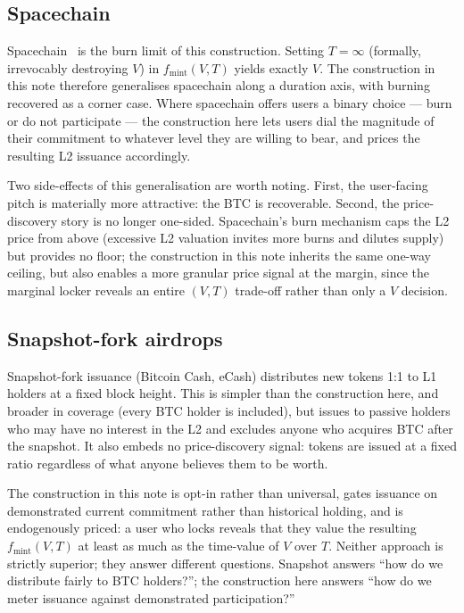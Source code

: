\documentclass[11pt,a4paper]{article}
\newcommand{\fmint}{f_{\mathrm{mint}}}
\begin{document}
\subsection{Spacechain}

Spacechain~\cite{spacechain} is the burn limit of this construction. Setting $T = \infty$ (formally, irrevocably destroying $V$) in $\fmint(V, T)$ yields exactly $V$. The construction in this note therefore generalises spacechain along a duration axis, with burning recovered as a corner case. Where spacechain offers users a binary choice --- burn or do not participate --- the construction here lets users dial the magnitude of their commitment to whatever level they are willing to bear, and prices the resulting L2 issuance accordingly.

Two side-effects of this generalisation are worth noting. First, the user-facing pitch is materially more attractive: the BTC is recoverable. Second, the price-discovery story is no longer one-sided. Spacechain's burn mechanism caps the L2 price from above (excessive L2 valuation invites more burns and dilutes supply) but provides no floor; the construction in this note inherits the same one-way ceiling, but also enables a more granular price signal at the margin, since the marginal locker reveals an entire $(V, T)$ trade-off rather than only a $V$ decision.

\subsection{Snapshot-fork airdrops}

Snapshot-fork issuance (Bitcoin Cash, eCash) distributes new tokens 1:1 to L1 holders at a fixed block height. This is simpler than the construction here, and broader in coverage (every BTC holder is included), but issues to passive holders who may have no interest in the L2 and excludes anyone who acquires BTC after the snapshot. It also embeds no price-discovery signal: tokens are issued at a fixed ratio regardless of what anyone believes them to be worth.

The construction in this note is opt-in rather than universal, gates issuance on demonstrated current commitment rather than historical holding, and is endogenously priced: a user who locks reveals that they value the resulting $\fmint(V, T)$ at least as much as the time-value of $V$ over $T$. Neither approach is strictly superior; they answer different questions. Snapshot answers ``how do we distribute fairly to BTC holders?''; the construction here answers ``how do we meter issuance against demonstrated participation?''
\end{document}

